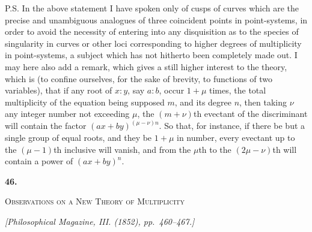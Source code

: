 \documentclass[11pt]{article}
\newcommand{\paperhead}[3]{%
  \clearpage
  \begin{center}
  {\Large\bfseries #1.}\par\vspace{0.85em}
  {\large\scshape #2}\par\vspace{0.6em}
  {\itshape [#3]}\par
  \end{center}\vspace{0.4em}}
\begin{document}
P.S. In the above statement I have spoken only of cusps of curves which are the precise and unambiguous analogues of three coincident points in point-systems, in order to avoid the necessity of entering into any disquisition as to the species of singularity in curves or other loci corresponding to higher degrees of multiplicity in point-systems, a subject which has not hitherto been completely made out. I may here also add a remark, which gives a still higher interest to the theory, which is (to confine ourselves, for the sake of brevity, to functions of two variables), that if any root of $x:y$, say $a:b$, occur $1+\mu$ times, the total multiplicity of the equation being supposed $m$, and its degree $n$, then taking $\nu$ any integer number not exceeding $\mu$, the $(m+\nu)$th evectant of the discriminant will contain the factor $(ax+by)^{(\mu-\nu)n}$. So that, for instance, if there be but a single group of equal roots, and they be $1+\mu$ in number, every evectant up to the $(\mu-1)$th inclusive will vanish, and from the $\mu$th to the $(2\mu-\nu)$th will contain a power of $(ax+by)^n$.

\paperhead{46}{Observations on a New Theory of Multiplicity}{Philosophical Magazine, III. (1852), pp.~460--467.}
\end{document}
